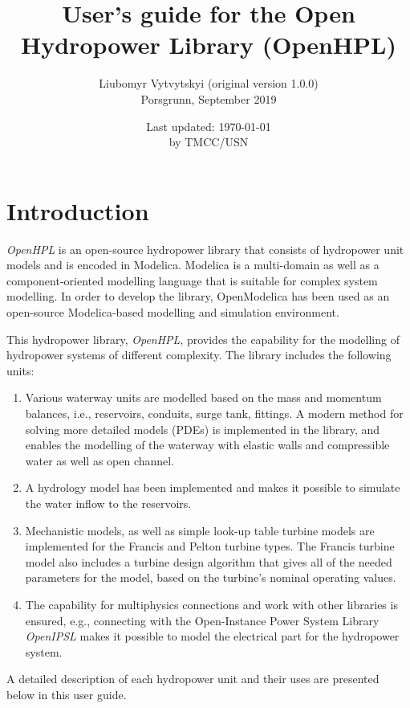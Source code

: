 \documentclass[%
]{USN-PhD}
\title{User's guide for the Open Hydropower Library (OpenHPL)}
\author{Liubomyr Vytvytskyi (original version 1.0.0)\\
  Porsgrunn, \nth{6} September 2019}
\date{Last updated: \today\\ by TMCC/USN }
\begin{document}
\maketitle



\tableofcontents

\chapter{Introduction}

\emph{OpenHPL} is an open-source hydropower library that consists of hydropower unit models and is encoded in Modelica. Modelica is a multi-domain as well as a component-oriented modelling language that is suitable for complex system modelling. In order to develop the library, OpenModelica has been used as an open-source Modelica-based modelling and simulation environment.

This hydropower library, \emph{OpenHPL}, provides the capability for the modelling of hydropower systems of different complexity. The library includes the following units:
\begin{enumerate}
\item Various waterway units are modelled based on the mass and momentum balances, i.e., reservoirs, conduits, surge tank, fittings. A modern method for solving more detailed models (PDEs) is implemented in the library, and enables the modelling of the waterway with elastic walls and compressible water as well as open channel.
\item A hydrology model has been implemented and makes it possible to simulate the water inflow to the reservoirs.
\item Mechanistic models, as well as simple look-up table turbine models are implemented for the Francis and Pelton turbine types. The Francis turbine model also includes a turbine design algorithm that gives all of the needed parameters for the model, based on the turbine's nominal operating values.
\item The capability for multiphysics connections and work with other libraries is ensured, e.g., connecting with the Open-Instance Power System Library \emph{OpenIPSL} makes it possible to model the electrical part for the hydropower system.
\end{enumerate}

A detailed description of each hydropower unit and their uses are presented below in this user guide.
\end{document}
